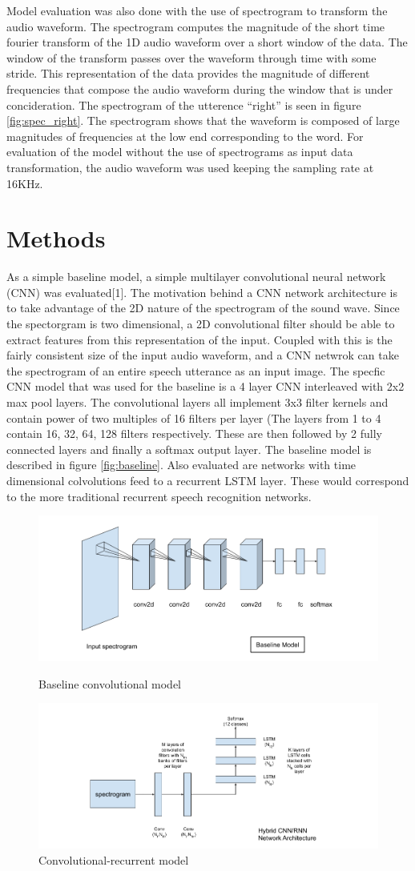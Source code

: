 \documentclass{article}
\begin{document}
Model evaluation was also done with the use of spectrogram to
transform the audio waveform. The spectrogram computes the magnitude
of the short time fourier transform of the 1D audio waveform over a
short window of the data. The window of the transform passes over the
waveform through time with some stride. This representation of the
data provides the magnitude of different frequencies that compose the
audio waveform during the window that is under concideration. The
spectrogram of the utterence ``right'' is seen in figure
\ref{fig:spec_right}. The spectrogram shows that the waveform is
composed of large magnitudes of frequencies at the low end
corresponding to the word. For evaluation of the model without the use
of spectrograms as input data transformation, the audio waveform was
used keeping the sampling rate at 16KHz.

\section{ Methods }
As a simple baseline model, a simple multilayer convolutional neural
network (CNN) was evaluated[1]. The motivation behind a CNN network
architecture is to take advantage of the 2D nature of the spectrogram
of the sound wave. Since the spectorgram is two dimensional, a 2D
convolutional filter should be able to extract features from this
representation of the input. Coupled with this is the fairly
consistent size of the input audio waveform, and a CNN netwrok can
take the spectrogram of an entire speech utterance as an input
image. The specfic CNN model that was used for the baseline is a 4
layer CNN interleaved with 2x2 max pool layers. The convolutional
layers all implement 3x3 filter kernels and contain power of two
multiples of 16 filters per layer (The layers from 1 to 4 contain
16, 32, 64, 128 filters respectively. These are then followed by 2
fully connected layers and finally a softmax output layer. The
baseline model is described in figure \ref{fig:baseline}. Also
evaluated are networks with time dimensional colvolutions feed to a
recurrent LSTM layer. These would correspond to the more traditional
recurrent speech recognition networks.

\begin{figure}
  \includegraphics[width=.48\textwidth]{images/baseline}
  \caption{Baseline convolutional model}
  \label{fig:baseline}
  \includegraphics[width=.48\textwidth]{images/crnn}
  \caption{Convolutional-recurrent model}
  \label{fig:crnn}
\end{figure}
\end{document}
